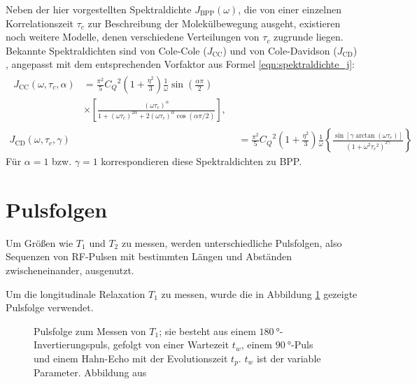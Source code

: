 Neben der hier vorgestellten Spektraldichte $J_\text{BPP}(\omega)$, die von einer einzelnen Korrelationszeit $\tau_c$ zur Beschreibung der Molekülbewegung ausgeht, existieren noch weitere Modelle, denen verschiedene Verteilungen von $\tau_c$ zugrunde liegen. Bekannte Spektraldichten sind von Cole-Cole ($J_\text{CC}$) und von Cole-Davidson ($J_\text{CD}$) \cite[S. 105-108]{beckmann_relaxation}, angepasst mit dem entsprechenden Vorfaktor aus Formel \eqref{eqn:spektraldichte_j}:
\begin{align}
\begin{split}
    J_\text{CC}(\omega, \tau_c, \alpha) &= \frac{\pi^2}{5} {C_Q}^2 \left( 1 + \frac{\eta^2}{3} \right) \frac{1}{\omega} \sin \left( \frac{\alpha \pi}{2} \right) \\ &\times \left[ \frac{(\omega \tau_c)^\alpha}{1 + (\omega \tau_c)^{2\alpha} + 2 (\omega \tau_c)^\alpha \cos (\alpha \pi / 2)} \right],
\end{split} \\
    J_\text{CD}(\omega, \tau_c, \gamma) &= \frac{\pi^2}{5} {C_Q}^2 \left( 1 + \frac{\eta^2}{3} \right) \frac{1}{\omega} \left\{ \frac{\sin [\gamma \arctan(\omega \tau_c)]}{(1 + \omega^2 {\tau_c}^2)^{2\gamma}} \right\}
\end{align}
Für $\alpha = 1$ bzw. $\gamma = 1$ korrespondieren diese Spektraldichten zu BPP.





\section{Pulsfolgen} \label{section:theo:pulsfolgen}

Um Größen wie $T_1$ und $T_2$ zu messen, werden unterschiedliche Pulsfolgen, also Sequenzen von RF-Pulsen mit bestimmten Längen und Abständen zwischeneinander, ausgenutzt.

Um die longitudinale Relaxation $T_1$ zu messen, wurde die in Abbildung \ref{fig:theo:pulsT1} gezeigte Pulsfolge verwendet.
\begin{figure}
	\begin{center}
		
	\end{center}
    \caption{Pulsfolge zum Messen von $T_1$; sie besteht aus einem $\SI{180}{\degree}$-Invertierungspuls, gefolgt von einer Wartezeit $t_w$, einem $\SI{90}{\degree}$-Puls und einem Hahn-Echo mit der Evolutionszeit $t_p$. $t_w$ ist der variable Parameter. Abbildung aus \cite{joachim_master}}\label{fig:theo:pulsT1}
\end{figure}

